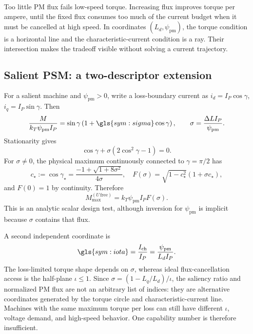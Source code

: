 

Too little PM flux fails low-speed torque.  Increasing flux improves torque per
ampere, until the fixed flux consumes too much of the current budget when it
must be cancelled at high speed.  In coordinates
\((L_d,\psi_{\mathrm{pm}})\), the torque condition is a horizontal line and
the characteristic-current condition is a ray.  Their intersection makes the
tradeoff visible without solving a current trajectory.

\subsection{Salient PSM: a two-descriptor extension}

For a salient machine and \(\psi_{\mathrm{pm}}>0\), write a loss-boundary
current as \(i_d=I_P\cos\gamma\), \(i_q=I_P\sin\gamma\).  Then
\begin{equation}
 \frac{M}{k_T\psi_{\mathrm{pm}}I_P}
 =\sin\gamma\left(1+\gls{sym:sigma}\cos\gamma\right),
 \qquad \sigma=\frac{\Delta L I_P}{\psi_{\mathrm{pm}}}.
 \label{eq:psm-normalized-torque}
\end{equation}
Stationarity gives
\begin{equation}
 \cos\gamma+\sigma(2\cos^2\gamma-1)=0.
\end{equation}
For \(\sigma\neq0\), the physical maximum continuously connected to
\(\gamma=\pi/2\) has
\begin{equation}
 c_\star:=\cos\gamma_\star
 =\frac{-1+\sqrt{1+8\sigma^2}}{4\sigma},
 \quad
 F(\sigma)=\sqrt{1-c_\star^2}(1+\sigma c_\star),
 \label{eq:salient-factor}
\end{equation}
and \(F(0)=1\) by continuity.  Therefore
\begin{equation}
 M_{\max}^{(U\,\mathrm{free})}
 =k_T\psi_{\mathrm{pm}}I_PF(\sigma).
 \label{eq:salient-psm-capability}
\end{equation}
This is an analytic scalar design test, although inversion for
\(\psi_{\mathrm{pm}}\) is implicit because \(\sigma\) contains that flux.

A second independent coordinate is
\begin{equation}
 \gls{sym:iota}=\frac{I_{\mathrm{ch}}}{I_P}
 =\frac{\psi_{\mathrm{pm}}}{L_dI_P}.
 \label{eq:characteristic-ratio}
\end{equation}
The loss-limited torque shape depends on \(\sigma\), whereas ideal
flux-cancellation access is the half-plane \(\iota\leq1\).  Since
\(\sigma=(1-L_q/L_d)/\iota\), the saliency ratio and normalized PM flux are
not an arbitrary list of indices: they are alternative coordinates generated
by the torque circle and characteristic-current line.  Machines with the same
maximum torque per loss can still have different \(\iota\), voltage demand,
and high-speed behavior.  One capability number is therefore insufficient.

